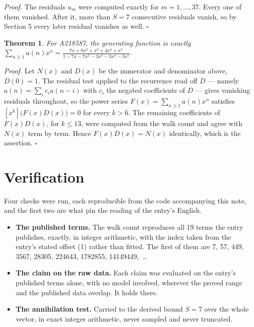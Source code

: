 \documentclass[11pt]{article}
\newtheorem{theorem}{Theorem}
\theoremstyle{definition}
\begin{document}
{\itshape Proof.} The residuals $u_m$ were computed exactly for $m = 1,\dots,37$. Every one of them vanished. After it, more than $S = 7$ consecutive residuals vanish, so by Section 5 every later residual vanishes as well. $\square$

\begin{theorem} For A218587, the generating function is exactly $\sum_{n\ge 1} a(n)x^n = \frac{7x + 8x^{2} + x^{3} + 4x^{4} + x^{5}}{1 - 7x - 7x^{2} - 3x^{3} - 3x^{4} - 3x^{5}}$.\end{theorem}

{\itshape Proof.} Let $N(x)$ and $D(x)$ be the numerator and denominator above, $D(0)=1$. The residual test applied to the recurrence read off $D$ --- namely $a(n) = \sum_i c_i a(n-i)$ with $c_i$ the negated coefficients of $D$ --- gives vanishing residuals throughout, so the power series $F(x)=\sum_{n\ge 1}a(n)x^n$ satisfies $[x^k]\bigl(F(x)D(x)\bigr) = 0$ for every $k > 6$. The remaining coefficients of $F(x)D(x)$, for $k \le 13$, were computed from the walk count and agree with $N(x)$ term by term. Hence $F(x)D(x) = N(x)$ identically, which is the assertion. $\square$

\section{Verification}

Four checks were run, each reproducible from the code accompanying this note, and the first two are what pin the reading of the entry's English.

\begin{itemize}

\item {\bfseries The published terms.} The walk count reproduces all 19 terms the entry publishes, exactly, in integer arithmetic, with the index taken from the entry's stated offset (1) rather than fitted. The first of them are 7, 57, 449, 3567, 28305, 224643, 1782855, 14149449,~\dots

\item {\bfseries The claim on the raw data.} Each claim was evaluated on the entry's published terms alone, with no model involved, wherever the proved range and the published data overlap. It holds there.

\item {\bfseries The annihilation test.} Carried to the derived bound $S = 7$ over the whole vector, in exact integer arithmetic, never sampled and never truncated.

\end{itemize}
\end{document}

